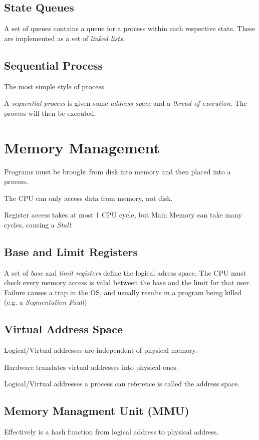 \documentclass[a4]{article}
\begin{document}
\subsection{State Queues}

A set of queues contains a queue for a process within each respective state. These are implemented as a set of \textit{linked lists}. 

\subsection{Sequential Process}

The most simple style of process.

A \textit{sequential process} is given some \textit{address space} and a \textit{thread of execution}. The process will then be executed.

\section{Memory Management}
Programs must be brought from disk into memory and then placed into a process.

The CPU can only access data from memory, not disk.

Register access takes at most 1 CPU cycle, but Main Memory can take many cycles, causing a \emph{Stall}.

\subsection{Base and Limit Registers}
A set of \emph{base} and \emph{limit registers} define the logical adress space. The CPU must check every
memory access is valid between the base and the limit for that user. Failure causes a trap in the OS, and usually results in a program being killed (e.g. a \emph{Segmentation Fault})

\subsection{Virtual Address Space}
Logical/Virtual addresses are independent of physical memory.

Hardware translates virtual addresses into physical ones.

Logical/Virtual addresses a process can reference is called the address space.

\subsection{Memory Managment Unit (MMU)}
Effectively is a hash function from logical address to physical address.
\end{document}
